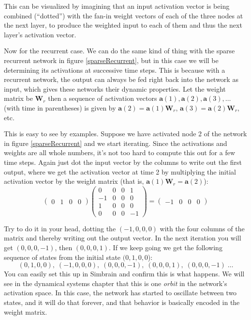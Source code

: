 This can be visualized by imagining that an input activation vector is being combined (``dotted'') with the fan-in weight vectors of each of the three nodes at the next layer, to produce the weighted input to each of them and thus the next layer's activation vector. 

Now for the recurrent case. We can do the same kind of thing with the sparse recurrent network in figure \ref{sparseRecurrent}, but in this case we will be determining its activations at successive time steps. This is because with a recurrent network, the output can always be fed right back into the network as input, which gives these networks their dynamic properties. Let the weight matrix be  $\textbf{W}_{r}$ then a sequence of activation vectors $\textbf{a}(1), \textbf{a}(2), \textbf{a}(3), \dots$ (with time in parentheses) is given by $\textbf{a}(2) = \textbf{a}(1) \textbf{W}_{r}$, $\textbf{a}(3) = \textbf{a}(2) \textbf{W}_{r}$, etc. 

This is easy to see by examples. Suppose we have activated node 2 of the network in figure \ref{sparseRecurrent} and we start iterating. Since the activations and weights are all whole numbers, it's not too hard to compute this out for a few time steps. Again just dot the input vector by the columns to write out the first output, where we get the activation vector at time 2 by multiplying the initial activation vector by the weight matrix (that is, $\textbf{a}(1) \textbf{W}_{r} = \textbf{a}(2)$):
\[
\begin{pmatrix}
0 & 1 & 0 & 0  
\end{pmatrix} 
\begin{pmatrix}
0 & 0 & 0 & 1 \\
-1 & 0 & 0 & 0 \\
1 & 0 & 0 & 0 \\
0 & 0 & 0 & -1
\end{pmatrix}
=
\begin{pmatrix}
-1 & 0 & 0 & 0
\end{pmatrix} 
\]
\vspace*{.1cm} 

\noindent Try to do it in your head, dotting the $(-1, 0,0,0)$ with the four columns of the matrix and thereby writing out the output vector. In the next iteration you will get $(0,0,0,-1)$, then $(0,0,0,1)$. If we keep going we get the following sequence of states from the initial state $(0,1,0,0$):
\begin{equation*}
(0,1,0,0),\; (-1,0,0,0),\; (0,0,0,-1),\; (0,0,0,1),\;  (0,0,0,-1)\; \dots
\end{equation*}
You can easily set this up in Simbrain and confirm this is what happens. We will see in the dynamical systems chapter  that this is one \emph{orbit} in the network's activation space. In this case, the network has started to oscillate between two states, and it will do that forever, and that behavior is basically encoded in the weight matrix.

